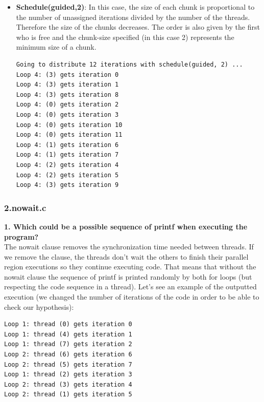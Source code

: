 \documentclass[12]{article}
\begin{document}
\begin{itemize}
\item \textbf{Schedule(guided,2)}: In this case, the size of each chunk is proportional to the number of unassigned iterations divided by the number of the threads. Therefore the size of the chunks decreases. The order is also given by the first who is free and the chunk-size specified (in this case 2) represents the minimum size of a chunk. 
\\
\begin{lstlisting}[frame=single]
Going to distribute 12 iterations with schedule(guided, 2) ...
Loop 4: (3) gets iteration 0
Loop 4: (3) gets iteration 1
Loop 4: (3) gets iteration 8
Loop 4: (0) gets iteration 2
Loop 4: (0) gets iteration 3
Loop 4: (0) gets iteration 10
Loop 4: (0) gets iteration 11
Loop 4: (1) gets iteration 6
Loop 4: (1) gets iteration 7
Loop 4: (2) gets iteration 4
Loop 4: (2) gets iteration 5
Loop 4: (3) gets iteration 9
\end{lstlisting}
\end{itemize}


\subsubsection{2.nowait.c}
\textbf{1. Which could be a possible sequence of printf when executing the program?}
\\
The nowait clause removes the synchronization time needed between threads. If we remove the clause, the threads don't wait the others to finish their parallel region executions so they continue executing code. That means that without the nowait clause the sequence of printf is printed randomly by both for loops (but respecting the code sequence in a thread). 
Let's see an example of the outputted execution (we changed the number of iterations of the code in order to be able to check our hypothesis): 
\\
\begin{lstlisting}[frame=single]
Loop 1: thread (0) gets iteration 0
Loop 1: thread (4) gets iteration 1
Loop 1: thread (7) gets iteration 2
Loop 2: thread (6) gets iteration 6
Loop 2: thread (5) gets iteration 7
Loop 1: thread (2) gets iteration 3
Loop 2: thread (3) gets iteration 4
Loop 2: thread (1) gets iteration 5

\end{lstlisting}
\end{document}
